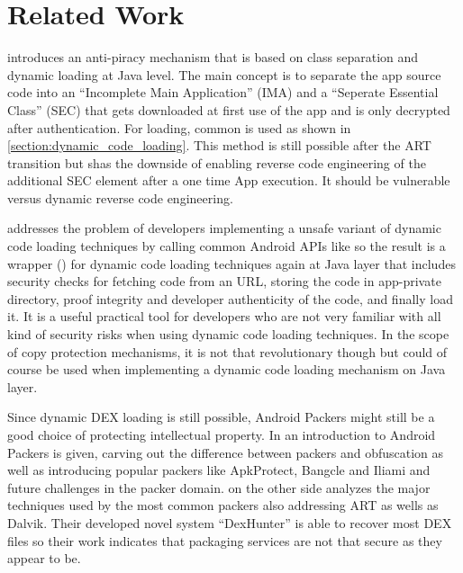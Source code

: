 \chapter{Related Work}\label{chapter:related_workd}
\parencite{anti_piracy} introduces an anti-piracy mechanism that is based on class
separation and dynamic loading at Java level. The main concept is to separate the app source code into an ``Incomplete Main Application'' (IMA) and a ``Seperate Essential Class'' (SEC) that gets downloaded at first use of the app and is only decrypted after authentication. For loading, common  is used as shown in
\autoref{section:dynamic_code_loading}. This method is still possible after the ART transition but shas the downside of enabling reverse code engineering of the additional SEC
element after a one time App execution. It should be vulnerable versus dynamic reverse code engineering.

\parencite{grab_n_run} addresses the problem of developers implementing a unsafe variant of dynamic code loading techniques by calling common Android APIs like  so the result is a wrapper () for dynamic code loading techniques again at Java layer that includes security checks for fetching code from an URL, storing the code in app-private directory, proof integrity and developer authenticity of the code, and finally load it. It is a useful practical tool for developers who are not very familiar with all kind of security risks when using dynamic code loading techniques. In the scope of copy protection mechanisms, it is not that revolutionary though but could of course be used when implementing a dynamic code loading mechanism on Java layer.

Since dynamic DEX loading is still possible, Android Packers might still be a
good choice of protecting intellectual property. In \parencite{android_packer}
an introduction to Android Packers is given, carving out the difference between
packers and obfuscation as well as introducing popular packers like ApkProtect,
Bangcle and Iliami and future challenges in the packer domain.
\parencite{dexhunter} on the other side analyzes the major techniques
used by the most common packers also addressing ART as wells as Dalvik.
Their developed novel system ``DexHunter'' is able to recover most DEX files so
their work indicates that packaging services are not that secure as they appear to be.

